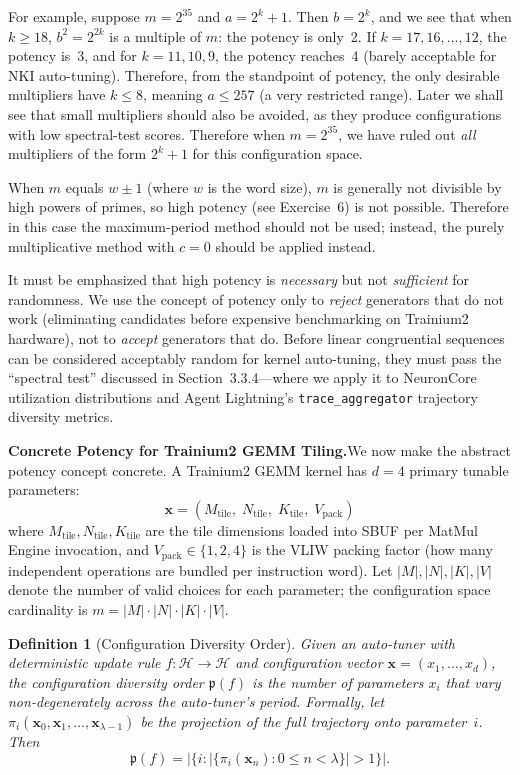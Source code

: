 \documentclass[12pt]{article}
\newcommand{\HardwareSpace}{\mathcal{H}}        %
\newcommand{\KernelConfig}{\mathbf{x}}           %
\newcommand{\SchedulePeriod}{\lambda}             %
\newcommand{\ConfigDiversity}{\mathfrak{p}}       %
\newcommand{\SBUF}{\textsc{SBUF}}                 %
\newtheorem{definition}[theorem]{Definition}
\begin{document}
For example, suppose $m = 2^{35}$ and $a = 2^k + 1$. Then $b = 2^k$, and we see that when $k \geq 18$, $b^2 = 2^{2k}$ is a multiple of $m$: the potency is only~2. If $k = 17, 16, \ldots, 12$, the potency is~3, and for $k = 11, 10, 9$, the potency reaches~4 (barely acceptable for NKI auto-tuning). Therefore, from the standpoint of potency, the only desirable multipliers have $k \leq 8$, meaning $a \leq 257$ (a very restricted range). Later we shall see that small multipliers should also be avoided, as they produce configurations with low spectral-test scores. Therefore when $m = 2^{35}$, we have ruled out \emph{all} multipliers of the form $2^k + 1$ for this configuration space.

When $m$ equals $w \pm 1$ (where $w$ is the word size), $m$ is generally not divisible by high powers of primes, so high potency (see Exercise~6) is not possible. Therefore in this case the maximum-period method should not be used; instead, the purely multiplicative method with $c = 0$ should be applied instead.

It must be emphasized that high potency is \emph{necessary} but not \emph{sufficient} for randomness. We use the concept of potency only to \emph{reject} generators that do not work (eliminating candidates before expensive benchmarking on Trainium2 hardware), not to \emph{accept} generators that do. Before linear congruential sequences can be considered acceptably random for kernel auto-tuning, they must pass the ``spectral test'' discussed in Section~3.3.4---where we apply it to NeuronCore utilization distributions and Agent Lightning's \texttt{trace\_aggregator} trajectory diversity metrics.

\medskip
\noindent\textbf{Concrete Potency for Trainium2 GEMM Tiling.}\quad We now make the abstract potency concept concrete. A Trainium2 GEMM kernel has $d=4$ primary tunable parameters:
\[
\KernelConfig = (M_{\mathrm{tile}},\; N_{\mathrm{tile}},\; K_{\mathrm{tile}},\; V_{\mathrm{pack}})
\]
where $M_{\mathrm{tile}}, N_{\mathrm{tile}}, K_{\mathrm{tile}}$ are the tile dimensions loaded into \SBUF{} per MatMul Engine invocation, and $V_{\mathrm{pack}} \in \{1,2,4\}$ is the VLIW packing factor (how many independent operations are bundled per instruction word). Let $|M|, |N|, |K|, |V|$ denote the number of valid choices for each parameter; the configuration space cardinality is $m = |M| \cdot |N| \cdot |K| \cdot |V|$.

\begin{definition}[Configuration Diversity Order]\label{def:config-diversity}
Given an auto-tuner with deterministic update rule $f: \HardwareSpace \to \HardwareSpace$ and configuration vector $\KernelConfig = (x_1, \ldots, x_d)$, the \emph{configuration diversity order} $\ConfigDiversity(f)$ is the number of parameters $x_i$ that vary non-degenerately across the auto-tuner's period. Formally, let $\pi_i(\KernelConfig_0, \KernelConfig_1, \ldots, \KernelConfig_{\SchedulePeriod-1})$ be the projection of the full trajectory onto parameter~$i$. Then
\[
\ConfigDiversity(f) = \bigl|\{i : |\{\pi_i(\KernelConfig_n) : 0 \le n < \SchedulePeriod\}| > 1\}\bigr|.
\]
\end{definition}
\end{document}
